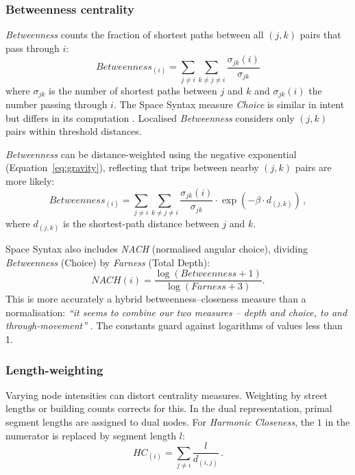 \subsubsection{Betweenness centrality}

\emph{Betweenness} \cite{Freeman1977} counts the fraction of shortest paths between all $(j, k)$ pairs that pass through $i$:
\begin{equation}\label{eq:betweenness}
  Betweenness_{(i)} = \sum_{j\neq{i}} \sum_{k\neq{j}\neq{i}} \frac{\sigma_{jk}(i)}{\sigma_{jk}}
\end{equation}
where $\sigma_{jk}$ is the number of shortest paths between $j$ and $k$ and $\sigma_{jk}(i)$ the number passing through $i$. The Space Syntax measure \emph{Choice} is similar in intent but differs in its computation \cite{stahle_place_2023}. Localised \emph{Betweenness} considers only $(j, k)$ pairs within threshold distances.

\emph{Betweenness} can be distance-weighted using the negative exponential (Equation~\ref{eq:gravity}), reflecting that trips between nearby $(j, k)$ pairs are more likely:
\begin{equation}\label{eq:weighted_betweenness}
  Betweenness_{(i)}=\sum_{j\neq{i}}\sum_{k\neq{j}\neq{i}} \frac{\sigma_{jk}(i)}{\sigma_{jk}}\cdot\exp(-\beta\cdot d_{(j,k)})\, ,
\end{equation}
where $d_{(j,k)}$ is the shortest-path distance between $j$ and $k$.

Space Syntax also includes \emph{NACH} (normalised angular choice), dividing \emph{Betweenness} (Choice) by \emph{Farness} (Total Depth):
\begin{equation}\label{eq:nach}
  NACH{(i)}=\frac{\log(Betweenness + 1)}{\log(Farness + 3)}.
\end{equation}
This is more accurately a hybrid betweenness--closeness measure than a normalisation: \emph{``it seems to combine our two measures -- depth and choice, to and through-movement''} \cite{Hillier2012}. The constants guard against logarithms of values less than 1.

\subsubsection{Length-weighting}
Varying node intensities can distort centrality measures. Weighting by street lengths \cite{Turner2005a, Turner2007} or building counts \cite{Sevtsuk2012} corrects for this. In the dual representation, primal segment lengths are assigned to dual nodes. For \emph{Harmonic Closeness}, the $1$ in the numerator is replaced by segment length $l$:
\begin{equation}\label{eq:harmonic_length_weighted}
  HC_{(i)} = \sum_{j\neq{i}}\frac{l}{d_{(i,j)}}\, .
\end{equation}


